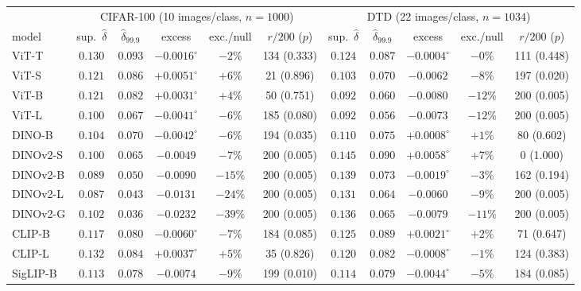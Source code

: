 \begin{table}[H]
\centering
\scriptsize
\setlength{\tabcolsep}{2.4pt}
\begin{tabular}{lccccc|ccccc}
\toprule
& \multicolumn{5}{c|}{CIFAR-100 (10 images/class, $n{=}1000$)} & \multicolumn{5}{c}{DTD (22 images/class, $n{=}1034$)} \\
model & sup.\ $\hat\delta$ & $\hat\delta_{99.9}$ & excess & exc./null & $r/200$ ($p$) & sup.\ $\hat\delta$ & $\hat\delta_{99.9}$ & excess & exc./null & $r/200$ ($p$) \\
\midrule
ViT-T & $0.130$ & $0.093$ & $-0.0016^{\circ}$ & $-2\%$ & 134 (0.333) & $0.124$ & $0.087$ & $-0.0004^{\circ}$ & $-0\%$ & 111 (0.448) \\
ViT-S & $0.121$ & $0.086$ & $+0.0051^{\circ}$ & $+6\%$ & 21 (0.896) & $0.103$ & $0.070$ & $-0.0062$ & $-8\%$ & 197 (0.020) \\
ViT-B & $0.121$ & $0.082$ & $+0.0031^{\circ}$ & $+4\%$ & 50 (0.751) & $0.092$ & $0.060$ & $-0.0080$ & $-12\%$ & 200 (0.005) \\
ViT-L & $0.100$ & $0.067$ & $-0.0041^{\circ}$ & $-6\%$ & 185 (0.080) & $0.092$ & $0.056$ & $-0.0073$ & $-12\%$ & 200 (0.005) \\
\midrule
DINO-B & $0.104$ & $0.070$ & $-0.0042^{\circ}$ & $-6\%$ & 194 (0.035) & $0.110$ & $0.075$ & $+0.0008^{\circ}$ & $+1\%$ & 80 (0.602) \\
DINOv2-S & $0.100$ & $0.065$ & $-0.0049$ & $-7\%$ & 200 (0.005) & $0.145$ & $0.090$ & $+0.0058^{\circ}$ & $+7\%$ & 0 (1.000) \\
DINOv2-B & $0.089$ & $0.050$ & $-0.0090$ & $-15\%$ & 200 (0.005) & $0.139$ & $0.073$ & $-0.0019^{\circ}$ & $-3\%$ & 162 (0.194) \\
DINOv2-L & $0.087$ & $0.043$ & $-0.0131$ & $-24\%$ & 200 (0.005) & $0.131$ & $0.064$ & $-0.0060$ & $-9\%$ & 200 (0.005) \\
DINOv2-G & $0.102$ & $0.036$ & $-0.0232$ & $-39\%$ & 200 (0.005) & $0.136$ & $0.065$ & $-0.0079$ & $-11\%$ & 200 (0.005) \\
\midrule
CLIP-B & $0.117$ & $0.080$ & $-0.0060^{\circ}$ & $-7\%$ & 184 (0.085) & $0.125$ & $0.089$ & $+0.0021^{\circ}$ & $+2\%$ & 71 (0.647) \\
CLIP-L & $0.132$ & $0.084$ & $+0.0037^{\circ}$ & $+5\%$ & 35 (0.826) & $0.120$ & $0.082$ & $-0.0008^{\circ}$ & $-1\%$ & 124 (0.383) \\
SigLIP-B & $0.113$ & $0.078$ & $-0.0074$ & $-9\%$ & 199 (0.010) & $0.114$ & $0.079$ & $-0.0044^{\circ}$ & $-5\%$ & 184 (0.085) \\

\end{tabular}
\end{table}
